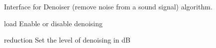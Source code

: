 
Interface for Denoiser (remove noise from a sound signal) algorithm.

\begin{urbiscriptapi}
\item[load] Enable or disable denoising
\item[reduction] Set the level of denoising in dB
\end{urbiscriptapi}







